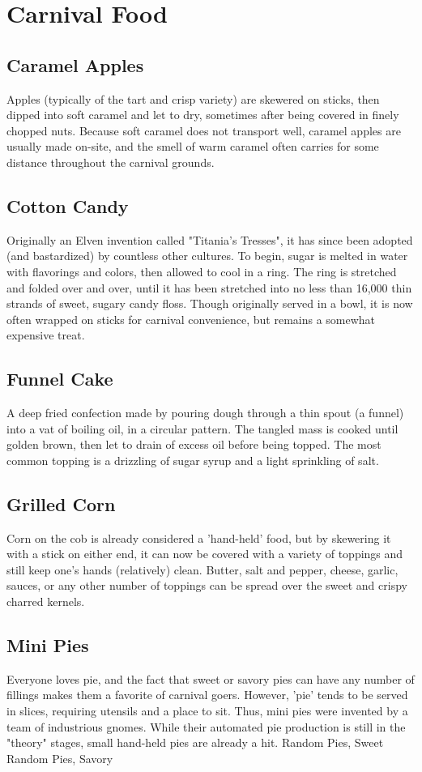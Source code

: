 \documentclass[10pt,a4paper,twoside,bg=print,twocolumn,openany,nodeprecatedcode]{dndbook}
\begin{document}
\section{Carnival Food}
\subsection{Caramel Apples}
Apples (typically of the tart and crisp variety) are skewered on sticks, then dipped into soft caramel and let to dry, sometimes after being covered in finely chopped nuts. Because soft caramel does not transport well, caramel apples are usually made on-site, and the smell of warm caramel often carries for some distance throughout the carnival grounds.
\subsection{Cotton Candy}
Originally an Elven invention called "Titania's Tresses", it has since been adopted (and bastardized) by countless other cultures. To begin, sugar is melted in water with flavorings and colors, then allowed to cool in a ring. The ring is stretched and folded over and over, until it has been stretched into no less than 16,000 thin strands of sweet, sugary candy floss. Though originally served in a bowl, it is now often wrapped on sticks for carnival convenience, but remains a somewhat expensive treat.
\subsection{Funnel Cake}
A deep fried confection made by pouring dough through a thin spout (a funnel) into a vat of boiling oil, in a circular pattern. The tangled mass is cooked until golden brown, then let to drain of excess oil before being topped. The most common topping is a drizzling of sugar syrup and a light sprinkling of salt.
\subsection{Grilled Corn}
Corn on the cob is already considered a 'hand-held' food, but by skewering it with a stick on either end, it can now be covered with a variety of toppings and still keep one's hands (relatively) clean. Butter, salt and pepper, cheese, garlic, sauces, or any other number of toppings can be spread over the sweet and crispy charred kernels.
\subsection{Mini Pies}
Everyone loves pie, and the fact that sweet or savory pies can have any number of fillings makes them a favorite of carnival goers. However, 'pie' tends to be served in slices, requiring utensils and a place to sit. Thus, mini pies were invented by a team of industrious gnomes. While their automated pie production is still in the "theory" stages, small hand-held pies are already a hit.
Random Pies, Sweet
Random Pies, Savory
\end{document}

